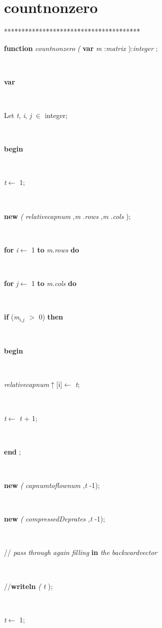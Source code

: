 \documentclass[10pt, a4paper]{article}
\begin{document}
\section{countnonzero}\label{sec:harmonyplancountnonzero}

\begin{tabbing}
***\=***\=***\=***\=***\=***\=***\=***\=***\=***\=***\=***\=***\=\kill
\parbox{14cm}{\textsf{\textbf{function}  \textit{countnonzero} \textit{(} \textbf{var}  \textit{m} :\textit{matrix} ):\textit{integer} ;}}\\
\+\parbox{14cm}{\textsf{\textbf{var} }}\\
\parbox{14cm}{\textsf{Let \textit{t}, \textit{i}, \textit{j} $\in$ integer;}}\\
\-\<\+\parbox{14cm}{\textsf{\textbf{begin} }}\\
\parbox{14cm}{\textsf{\textit{t}$\leftarrow$ 1}; }\\
\parbox{14cm}{\textsf{\textbf{new} \textit{(} \textit{relativecapnum} ,\textit{m} .\textit{rows} ,\textit{m} .\textit{cols} );}}\\
\+\parbox{14cm}{\textsf {\textbf {for } \textsf{\textit{i}$\leftarrow$ 1} \textbf{ to } \textsf{\textit{m.rows}} \textbf{ do } }}\\
\+\parbox{14cm}{\textsf {\textbf {for } \textsf{\textit{j}$\leftarrow$ 1} \textbf{ to } \textsf{\textit{m.cols}} \textbf{ do } }}\\
\+\parbox{14cm}{\textsf {\textbf {if } \textsf{(\textit{m}$_{\textit{i}, \textit{j}}$ $>$ 0)} \textbf{ then } }}\\
\<\parbox{14cm}{\textsf{\textbf{begin} }}\\
\parbox{14cm}{\textsf{\textit{relativecapnum}$\uparrow$\textit{}[i]$\leftarrow$ \textit{t}}; }\\
\parbox{14cm}{\textsf{\textit{t}$\leftarrow$ \textit{t} + 1}; }\\
\<\-\parbox{14cm}{\textsf{\textbf{end} ;}}\\
\parbox{14cm}{\textsf{\textbf{new} \textit{(} \textit{capnumtoflownum} ,\textit{t} -1);}}\\
\parbox{14cm}{\textsf{\textbf{new} \textit{(} \textit{compressedDeprates} ,\textit{t} -1);}}\\
\parbox{14cm}{\textsf{// \textit{pass}  \textit{through}  \textit{again}  \textit{filling}  \textbf{in}  \textit{the}  \textit{backwardvector} }}\\
\parbox{14cm}{\textsf{//\textbf{writeln} \textit{(} \textit{t} );}}\\
\parbox{14cm}{\textsf{\textit{t}$\leftarrow$ 1}; }\\

\end{tabbing}
\end{document}
